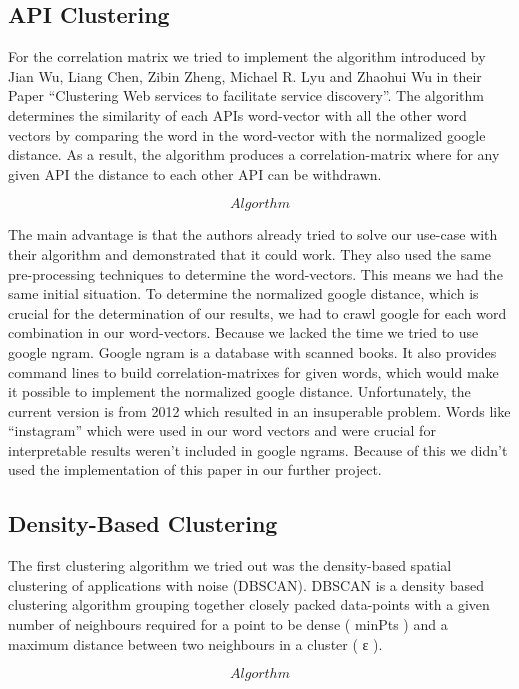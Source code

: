 \documentclass[a4paper]{IEEEtran}
\begin{document}
\subsection{API Clustering}
For the correlation matrix we tried to implement the algorithm introduced by Jian Wu, Liang Chen, Zibin Zheng, Michael R. Lyu and Zhaohui Wu in their Paper “Clustering Web services to facilitate service discovery”. The algorithm determines the similarity of each APIs word-vector with all the other word vectors by comparing the word in the word-vector with the normalized google distance. As a result, the algorithm produces a correlation-matrix where for any given API the distance to each other API can be withdrawn.

\begin{equation*}
Algorthm
\end{equation*}

The main advantage is that the authors already tried to solve our use-case with their algorithm and demonstrated that it could work. They also used the same pre-processing techniques to determine the word-vectors. This means we had the same initial situation.
To determine the normalized google distance, which is crucial for the determination of our results, we had to crawl google for each word combination in our word-vectors. Because we lacked the time we tried to use google ngram. Google ngram is a database with scanned books. It also provides command lines to build correlation-matrixes for given words, which would make it possible to implement the normalized google distance. Unfortunately, the current version is from 2012 which resulted in an insuperable problem. Words like “instagram” which were used in our word vectors and were crucial for interpretable results weren’t included in google ngrams. Because of this we didn’t used the implementation of this paper in our further project.

\subsection{Density-Based Clustering}
The first clustering algorithm we tried out was the density-based spatial clustering of applications with noise (DBSCAN). DBSCAN is a density based clustering algorithm grouping together closely packed data-points with a given number of neighbours required for a point to be dense ( minPts ) and a maximum distance between two neighbours in a cluster ( ε ). 

\begin{equation*}
Algorthm
\end{equation*}
\end{document}
